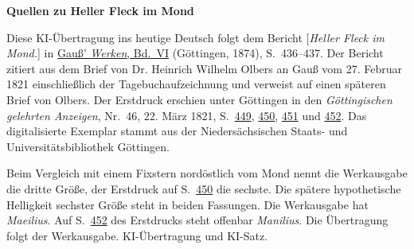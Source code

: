 \clearpage\thispagestyle{empty}
\begin{center}\textbf{Quellen zu Heller Fleck im Mond}\end{center}
\noindent Diese KI-Übertragung ins heutige Deutsch folgt dem Bericht [\textit{Heller Fleck im Mond.}] in \href{https://gdz.sub.uni-goettingen.de/id/PPN236007467}{Gauß’ \textit{Werken}, Bd.~VI} (Göttingen, 1874), S.~436--437. Der Bericht zitiert aus dem Brief von Dr. Heinrich Wilhelm Olbers an Gauß vom 27. Februar 1821 einschließlich der Tagebuchaufzeichnung und verweist auf einen späteren Brief von Olbers. Der Erstdruck erschien unter Göttingen in den \textit{Göttingischen gelehrten Anzeigen}, Nr.~46, 22. März 1821, S.~\href{https://images.p.sub.uni-goettingen.de/iiif/image/gdz:PPN319721507_1821:00000451/full/1600,/0/default.jpg}{449}, \href{https://images.p.sub.uni-goettingen.de/iiif/image/gdz:PPN319721507_1821:00000452/full/1600,/0/default.jpg}{450}, \href{https://images.p.sub.uni-goettingen.de/iiif/image/gdz:PPN319721507_1821:00000453/full/1600,/0/default.jpg}{451} und \href{https://images.p.sub.uni-goettingen.de/iiif/image/gdz:PPN319721507_1821:00000454/full/1600,/0/default.jpg}{452}. Das digitalisierte Exemplar stammt aus der Niedersächsischen Staats- und Universitätsbibliothek Göttingen.
\par\smallskip\noindent Beim Vergleich mit einem Fixstern nordöstlich vom Mond nennt die Werkausgabe die dritte Größe, der Erstdruck auf S.~\href{https://images.p.sub.uni-goettingen.de/iiif/image/gdz:PPN319721507_1821:00000452/full/1600,/0/default.jpg}{450} die sechste. Die spätere hypothetische Helligkeit sechster Größe steht in beiden Fassungen. Die Werkausgabe hat \textit{Maeilius}. Auf S.~\href{https://images.p.sub.uni-goettingen.de/iiif/image/gdz:PPN319721507_1821:00000454/full/1600,/0/default.jpg}{452} des Erstdrucks steht offenbar \textit{Manilius}. Die Übertragung folgt der Werkausgabe. KI-Übertragung und KI-Satz.
\clearpage
